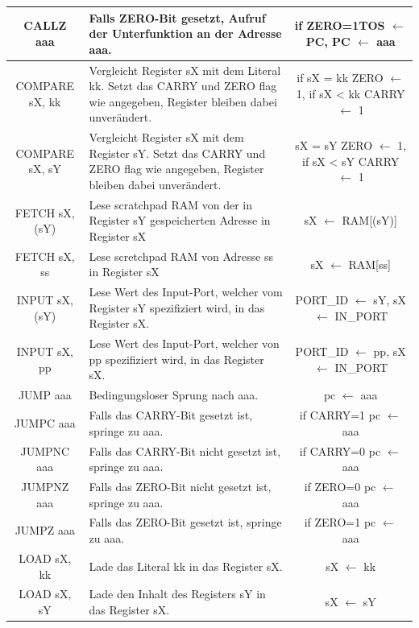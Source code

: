 \documentclass[bibliography=totoc,listof=totoc,index=totoc]{scrartcl}
\begin{document}
\begin{small}
\begin{longtable}{||c|p{6.5cm}|c||}
         CALLZ aaa & Falls ZERO-Bit gesetzt, Aufruf der Unterfunktion an der Adresse aaa. &if ZERO=1{TOS $\leftarrow$ PC, PC $\leftarrow$ aaa}\\ \hline
         COMPARE sX, kk & Vergleicht Register sX mit dem Literal kk. Setzt das CARRY und ZERO flag wie angegeben, Register bleiben dabei unverändert. & \makecell{if sX = kk ZERO $\leftarrow$ 1, \\ if sX \textless $ $ kk CARRY $\leftarrow$ 1 }  \\ \hline
         COMPARE sX, sY & Vergleicht Register sX mit dem Register sY. Setzt das CARRY und ZERO flag wie angegeben, Register bleiben dabei unverändert. & \makecell{sX = sY ZERO $\leftarrow$ 1, \\ if sX \textless $ $ sY CARRY $\leftarrow$ 1  }  \\ \hline
         FETCH sX, (sY) & Lese scratchpad RAM von der in Register sY gespeicherten Adresse in Register sX &sX $\leftarrow$ RAM[(sY)]   \\ \hline
         FETCH sX, ss & Lese scretchpad RAM von Adresse ss in Register sX &sX $\leftarrow$ RAM[ss]  \\ \hline
         INPUT sX, (sY) & Lese Wert des Input-Port, welcher vom Register sY spezifiziert wird, in das Register sX. &PORT\_ID $\leftarrow$ sY, sX $\leftarrow$ IN\_PORT  \\ \hline
         INPUT sX, pp & Lese Wert des Input-Port, welcher von pp spezifiziert wird, in das Register sX. &PORT\_ID $\leftarrow$ pp, sX $\leftarrow$ IN\_PORT \\ \hline
         JUMP aaa & Bedingungsloser Sprung nach aaa. &pc $\leftarrow$ aaa  \\ \hline
         JUMPC aaa & Falls das CARRY-Bit gesetzt ist, springe zu aaa. & if CARRY=1 pc $\leftarrow$ aaa \\ \hline
         JUMPNC aaa & Falls das CARRY-Bit nicht gesetzt ist, springe zu aaa. &if CARRY=0 pc $\leftarrow$ aaa  \\ \hline
         JUMPNZ aaa & Falls das ZERO-Bit nicht gesetzt ist, springe zu aaa. &if ZERO=0 pc $\leftarrow$ aaa  \\ \hline
         JUMPZ aaa & Falls das ZERO-Bit gesetzt ist, springe zu aaa. &if ZERO=1 pc $\leftarrow$ aaa  \\ \hline 
         LOAD sX, kk & Lade das Literal kk in das Register sX. &sX $\leftarrow$ kk   \\ \hline
         LOAD sX, sY & Lade den Inhalt des Registers sY in das Register sX. &sX $\leftarrow$ sY  \\ \hline 

\end{longtable}
\end{small}
\end{document}
